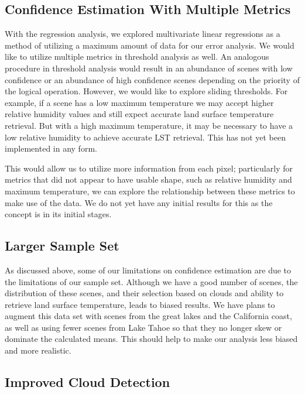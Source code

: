 \documentclass{book}
\begin{document}
\subsection{Confidence Estimation With Multiple Metrics}

With the regression analysis, we explored multivariate linear regressions as a method of utilizing a maximum amount of data for our error analysis.  We would like to utilize multiple metrics in threshold analysis as well.  An analogous procedure in threshold analysis would result in an abundance of scenes with low confidence or an abundance of high confidence scenes depending on the priority of the logical operation.  However, we would like to explore sliding thresholds.  For example, if a scene has a low maximum temperature we may accept higher relative humidity values and still expect accurate land surface temperature retrieval.  But with a high maximum temperature, it may be necessary to have a low relative humidity to achieve accurate LST retrieval.  This has not yet been implemented in any form.

This would allow us to utilize more information from each pixel; particularly for metrics that did not appear to have usable shape, such as relative humidity and maximum temperature, we can explore the relationship between these metrics to make use of the data.  We do not yet have any initial results for this as the concept is in its initial stages.

\subsection{Larger Sample Set}

As discussed above, some of our limitations on confidence estimation are due to the limitations of our sample set.  Although we have a good number of scenes, the distribution of these scenes, and their selection based on clouds and ability to retrieve land surface temperature, leads to biased results.  We have plans to augment this data set with scenes from the great lakes and the California coast, as well as using fewer scenes from Lake Tahoe so that they no longer skew or dominate the calculated means.  This should help to make our analysis less biased and more realistic.

\subsection{Improved Cloud Detection}
\end{document}
